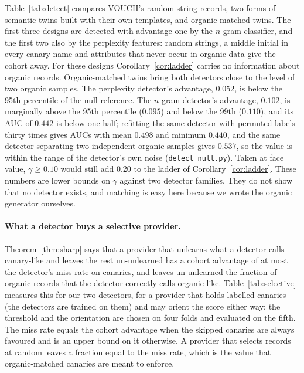 \begin{table}[t]
\centering\small
\caption{Detecting canaries among organic records ($400$ canaries and $400$ organic
records, five-fold out-of-fold scores). A detector's advantage is a lower bound on the
distinguishing advantage $\gamma$ of Theorem~\ref{thm:detect}. For reference, a detector
with label-independent scores exceeds an advantage of $0.095$ in $5\%$ and $0.110$ in
$1\%$ of $4{,}000$ simulations at this sample size (\texttt{detect\_null.py}).}
\label{tab:detect}

\end{table}

Table~\ref{tab:detect} compares VOUCH's random-string records, two forms of semantic
twins built with their own templates, and organic-matched twins. The first three designs
are detected with advantage one by the $n$-gram classifier, and the first two also by
the perplexity features: random strings, a middle initial in every canary name and
attributes that never occur in organic data give the cohort away. For these designs
Corollary~\ref{cor:ladder} carries no information about organic records. Organic-matched
twins bring both detectors close to the level of two organic samples. The perplexity
detector's advantage, $0.052$, is below the 95th percentile of the null reference. The
$n$-gram detector's advantage, $0.102$, is marginally above the 95th percentile ($0.095$)
and below the 99th ($0.110$), and its AUC of $0.442$ is below one half; refitting the same detector with permuted
labels thirty times gives AUCs with mean $0.498$ and minimum $0.440$, and the same
detector separating two independent organic samples gives $0.537$, so the value is within
the range of the detector's own noise (\texttt{detect\_null.py}). Taken at face value,
$\gamma\ge0.10$ would still add $0.20$ to the ladder of Corollary~\ref{cor:ladder}. These numbers are lower bounds on $\gamma$ against
two detector families. They do not show that no detector exists, and matching is easy
here because we wrote the organic generator ourselves.

\paragraph{What a detector buys a selective provider.} Theorem~\ref{thm:sharp} says that a
provider that unlearns what a detector calls canary-like and leaves the rest un-unlearned
has a cohort advantage of at most the detector's miss rate on canaries, and leaves
un-unlearned the fraction of organic records that the detector correctly calls
organic-like. Table~\ref{tab:selective} measures this for our two detectors, for a provider
that holds labelled canaries (the detectors are trained on them) and may orient the score
either way; the threshold and the orientation are chosen on four folds and evaluated on the
fifth. The miss rate equals the cohort advantage when the skipped canaries are always
favoured and is an upper bound on it otherwise. A provider that selects records at random
leaves a fraction equal to the miss rate, which is the value that organic-matched canaries
are meant to enforce.

